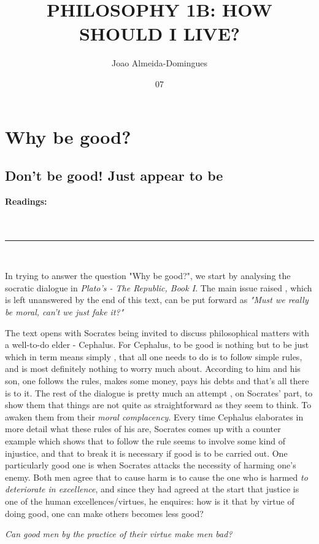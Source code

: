 \documentclass[english,course]{Notes}
\title{PHILOSOPHY 1B: HOW SHOULD I LIVE?}
\author{Joao Almeida-Domingues}
\date{07}{01}{2019}
\newcommand{\ita}[1]{\textit{#1}}
\newcommand\readings{\textbf{Readings:} \\}
\newcommand\sep{\\ \noindent\rule{10cm}{0.8pt} \\}
\newcommand\quo[1]{\begin{displayquote}\ita{\large{#1}}\end{displayquote}}
\begin{document}
\newpage

\section{Why be good?}

\subsection{Don't be good! Just appear to be}

\readings \cite{Nielsen1984} \\ \cite{PlatoRepublicI}
\sep

\par{ In trying to answer the question "Why be good?", we start by analysing the socratic dialogue in \ita{Plato's - The Republic, Book I}. The main issue raised , which is left unanswered by the end of this text,  can be put forward as \ita{"Must we really be moral, can't we just fake it?"}

\par{ The text opens with Socrates being invited to discuss philosophical matters with a well-to-do elder - Cephalus. For Cephalus, to be good is nothing but to be just which in term means simply , that all one needs to do is to follow simple rules, and is most definitely nothing to worry much about. According to him and his son, one follows the rules, makes some money, pays his debts and that's all there is to it. The rest of the dialogue is pretty much an attempt , on Socrates' part,  to show them that things are not quite as straightforward as they seem to think. To awaken them from their \ita{moral complacency}. Every time Cephalus elaborates in more detail what these rules of his are, Socrates comes up with a counter example which shows that to follow the rule seems to involve some kind of injustice, and that to break it is necessary if good is to be carried out. One particularly good one is when Socrates attacks the necessity of harming one's enemy. Both men agree that to cause harm is to cause the one who is harmed \ita{to deteriorate in excellence}, and since they had agreed at the start that justice is one of the human excellences/virtues, he enquires: how is it that by virtue of doing good, one can make others becomes less good?}

\quo{Can good men by the practice of their virtue make men bad?}

}
\end{document}
